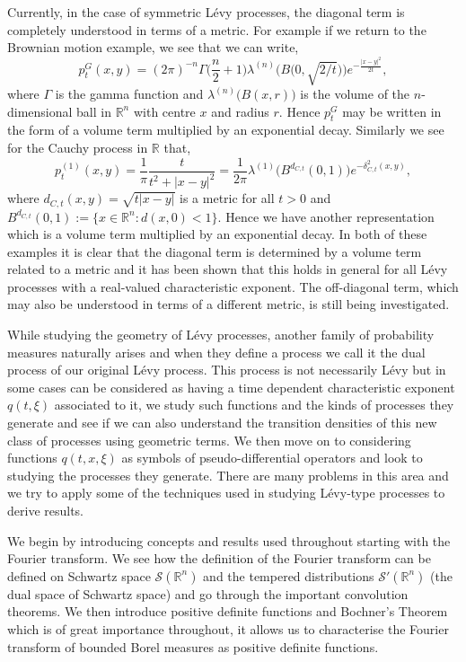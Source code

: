 \documentclass[a4paper, 12pt]{report}
\theoremstyle{cor}
\theoremstyle{remark}
\theoremstyle{definition}
\begin{document}
Currently, in the case of symmetric L\'evy processes, the diagonal term is completely understood in terms of a metric.  For example if we return to the Brownian motion example, we see that we can write,
$$
p_t^G(x, y) = (2\pi)^{-n}\Gamma\Big(\frac{n}{2} + 1\Big)\lambda^{(n)}\Big(B\big(0, \sqrt{2/t}\big)\Big)e^{-\frac{|x - y|^2}{2t}},
$$
where $\Gamma$ is the gamma function and $\lambda^{(n)}\big(B(x, r)\big)$ is the volume of the $n$-dimensional ball in $\mathbb{R}^n$ with centre $x$ and radius $r$.  Hence $p_t^G$ may be written in the form of a volume term multiplied by an exponential decay.  Similarly we see for the Cauchy process in $\mathbb{R}$ that,
$$
p_t^{(1)}(x, y) = \frac{1}{\pi}\frac{t}{t^2 + |x - y|^2} = \frac{1}{2\pi}\lambda^{(1)}\big(B^{d_{C, t}}(0, 1)\big)e^{-\delta_{C, t}^2(x, y)},
$$
where $d_{C, t}(x, y) = \sqrt{t|x - y|}$ is a metric for all $t > 0$ and $B^{d_{C, t}}(0, 1) := \{x \in \mathbb{R}^n : d(x, 0) < 1\}$.  Hence we have another representation which is a volume term multiplied by an exponential decay.  In both of these examples it is clear that the diagonal term is determined by a volume term related to a metric and it has been shown that this holds in general for all L\'evy processes with a real-valued characteristic exponent.  The off-diagonal term, which may also be understood in terms of a different metric, is still being investigated.  

While studying the geometry of L\'evy processes, another family of probability measures naturally arises and when they define a process we call it the dual process of our original L\'evy process.  This process is not necessarily L\'evy but in some cases can be considered as having a time dependent characteristic exponent $q(t, \xi)$ associated to it, we study such functions and the kinds of processes they generate and see if we can also understand the transition densities of this new class of processes using geometric terms.  We then move on to considering functions $q(t, x, \xi)$ as symbols of pseudo-differential operators and look to studying the processes they generate.  There are many problems in this area and we try to apply some of the techniques used in studying L\'evy-type processes to derive results.

We begin by introducing concepts and results used throughout starting with the Fourier transform.  We see how the definition of the Fourier transform can be defined on Schwartz space $\mathcal{S}(\mathbb{R}^n)$ and the tempered distributions $\mathcal{S}'(\mathbb{R}^n)$ (the dual space of Schwartz space) and go through the important convolution theorems.  We then introduce positive definite functions and Bochner's Theorem which is of great importance throughout, it allows us to characterise the Fourier transform of bounded Borel measures as positive definite functions.
\end{document}
